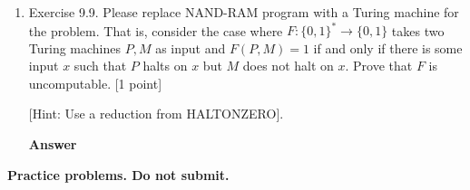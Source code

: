 \documentclass[11pt]{article}
\newcommand \kw[1]{\textbf{#1}}
\newenvironment{answer}{
\vspace{.5cm}
\begin{mdframed}[]
    \kw{Answer} 
}
{
\end{mdframed}
\pagebreak
}
\begin{document}
\begin{enumerate}
\begin{answer}
\end{answer}

\item Exercise 9.9. Please replace NAND-RAM program with a Turing machine for the problem. That is, consider the case where $F:\{0,1\}^* \rightarrow \{0,1\}$ takes two Turing machines $P,M$ as input and $F(P,M) = 1$ if and only if there is some input $x$ such that $P$ halts on $x$ but $M$ does not halt on $x$. Prove that $F$ is uncomputable. [1 point]

[Hint: Use a reduction from HALTONZERO].

\begin{answer}

\end{answer}   

\end{enumerate}

{\bf Practice problems. Do not submit.}
\end{document}
